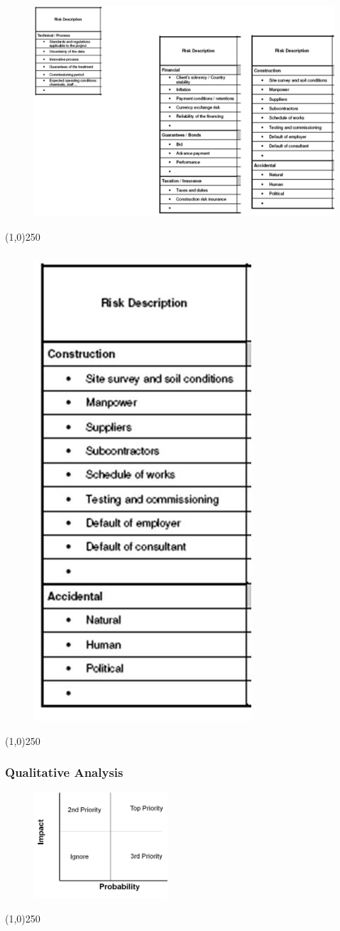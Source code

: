 \begin{frame}
\frametitle{}
\begin{figure}
	\centering
		\includegraphics[width = 8 cm]{images/veo2.jpg}
	\label{fig:veo2}
\end{figure}


\end{frame}\begin{center}\line(1,0){250}\end{center}




\begin{frame}
\frametitle{}
\begin{figure}
	\centering
		\includegraphics[width = 3 cm]{images/veo3.jpg}
	\label{fig:veo3}
\end{figure}

\end{frame}\begin{center}\line(1,0){250}\end{center}




\begin{frame}
\frametitle{Qualitative Analysis}
\begin{figure}
	\centering
		\includegraphics[width = 5cm ]{images/Matrix3.jpg}
	\label{fig:Matrix3.png}
\end{figure}

\end{frame}\begin{center}\line(1,0){250}\end{center}




